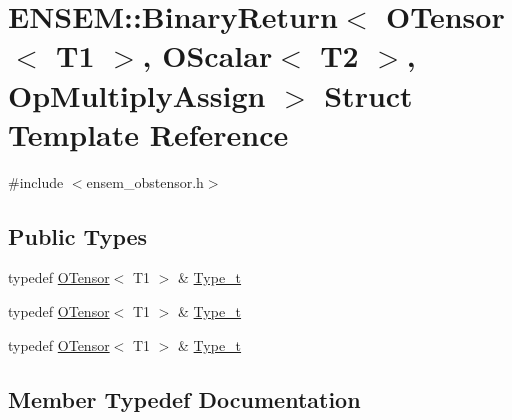 \hypertarget{structENSEM_1_1BinaryReturn_3_01OTensor_3_01T1_01_4_00_01OScalar_3_01T2_01_4_00_01OpMultiplyAssign_01_4}{}\section{E\+N\+S\+EM\+:\+:Binary\+Return$<$ O\+Tensor$<$ T1 $>$, O\+Scalar$<$ T2 $>$, Op\+Multiply\+Assign $>$ Struct Template Reference}
\label{structENSEM_1_1BinaryReturn_3_01OTensor_3_01T1_01_4_00_01OScalar_3_01T2_01_4_00_01OpMultiplyAssign_01_4}


{\ttfamily \#include $<$ensem\+\_\+obstensor.\+h$>$}

\subsection*{Public Types}
\begin{DoxyCompactItemize}
\item 
typedef \mbox{\hyperlink{classENSEM_1_1OTensor}{O\+Tensor}}$<$ T1 $>$ \& \mbox{\hyperlink{structENSEM_1_1BinaryReturn_3_01OTensor_3_01T1_01_4_00_01OScalar_3_01T2_01_4_00_01OpMultiplyAssign_01_4_ad42bea7881ddc7ca27cdfff7655d17fe}{Type\+\_\+t}}
\item 
typedef \mbox{\hyperlink{classENSEM_1_1OTensor}{O\+Tensor}}$<$ T1 $>$ \& \mbox{\hyperlink{structENSEM_1_1BinaryReturn_3_01OTensor_3_01T1_01_4_00_01OScalar_3_01T2_01_4_00_01OpMultiplyAssign_01_4_ad42bea7881ddc7ca27cdfff7655d17fe}{Type\+\_\+t}}
\item 
typedef \mbox{\hyperlink{classENSEM_1_1OTensor}{O\+Tensor}}$<$ T1 $>$ \& \mbox{\hyperlink{structENSEM_1_1BinaryReturn_3_01OTensor_3_01T1_01_4_00_01OScalar_3_01T2_01_4_00_01OpMultiplyAssign_01_4_ad42bea7881ddc7ca27cdfff7655d17fe}{Type\+\_\+t}}
\end{DoxyCompactItemize}


\subsection{Member Typedef Documentation}
\mbox{\label{structENSEM_1_1BinaryReturn_3_01OTensor_3_01T1_01_4_00_01OScalar_3_01T2_01_4_00_01OpMultiplyAssign_01_4_ad42bea7881ddc7ca27cdfff7655d17fe}} 
